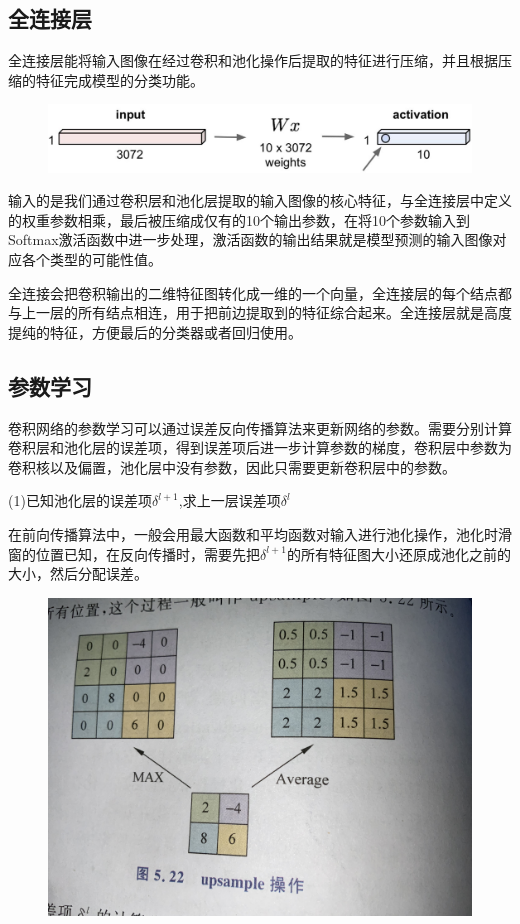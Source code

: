 \documentclass[openbib]{article}
\begin{document}
\subsection{全连接层}
全连接层能将输入图像在经过卷积和池化操作后提取的特征进行压缩，并且根据压缩的特征完成模型的分类功能。
\begin{figure}[htbp]
	\centering
	\includegraphics[scale=0.3]{4-6}
\end{figure}

输入的是我们通过卷积层和池化层提取的输入图像的核心特征，与全连接层中定义的权重参数相乘，最后被压缩成仅有的10个输出参数，在将10个参数输入到Softmax激活函数中进一步处理，激活函数的输出结果就是模型预测的输入图像对应各个类型的可能性值。

全连接会把卷积输出的二维特征图转化成一维的一个向量，全连接层的每个结点都与上一层的所有结点相连，用于把前边提取到的特征综合起来。全连接层就是高度提纯的特征，方便最后的分类器或者回归使用。
\subsection{参数学习}
卷积网络的参数学习可以通过误差反向传播算法来更新网络的参数。需要分别计算卷积层和池化层的误差项，得到误差项后进一步计算参数的梯度，卷积层中参数为卷积核以及偏置，池化层中没有参数，因此只需要更新卷积层中的参数。

(1)已知池化层的误差项$\delta^{l+1}$,求上一层误差项$\delta^l$

在前向传播算法中，一般会用最大函数和平均函数对输入进行池化操作，池化时滑窗的位置已知，在反向传播时，需要先把$\delta^{l+1}$的所有特征图大小还原成池化之前的大小，然后分配误差。
\begin{figure}[htbp]
	\centering
	\includegraphics[scale=0.05]{upsample操作}
\end{figure}
\end{document}
